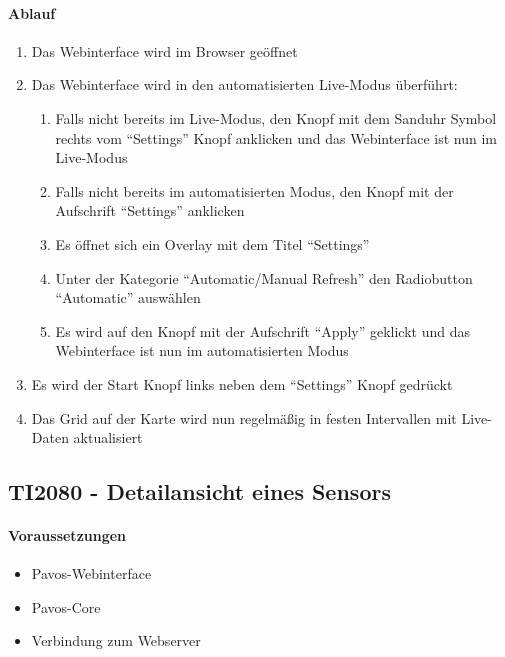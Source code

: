\paragraph{Ablauf}
\begin{enumerate}
\item Das Webinterface wird im Browser geöffnet
\item Das Webinterface wird in den automatisierten Live-Modus überführt:
\begin{enumerate}
\item Falls nicht bereits im Live-Modus, den Knopf mit dem Sanduhr Symbol rechts vom ``Settings'' Knopf anklicken und das Webinterface ist nun im Live-Modus
\item Falls nicht bereits im automatisierten Modus, den Knopf mit der Aufschrift ``Settings'' anklicken
\item Es öffnet sich ein Overlay mit dem Titel ``Settings''
\item Unter der Kategorie ``Automatic/Manual Refresh'' den Radiobutton ``Automatic'' auswählen
\item Es wird auf den Knopf mit der Aufschrift ``Apply'' geklickt und das Webinterface ist nun im automatisierten Modus
\end{enumerate}
\item Es wird der Start Knopf links neben dem ``Settings'' Knopf gedrückt
\item Das Grid auf der Karte wird nun regelmäßig in festen Intervallen mit Live-Daten aktualisiert
\end{enumerate}
\szenarioGood

\subsection{TI2080 - Detailansicht eines Sensors}
\paragraph{Voraussetzungen}
\begin{itemize}
\item Pavos-Webinterface
\item Pavos-Core
\item Verbindung zum Webserver
\end{itemize}
